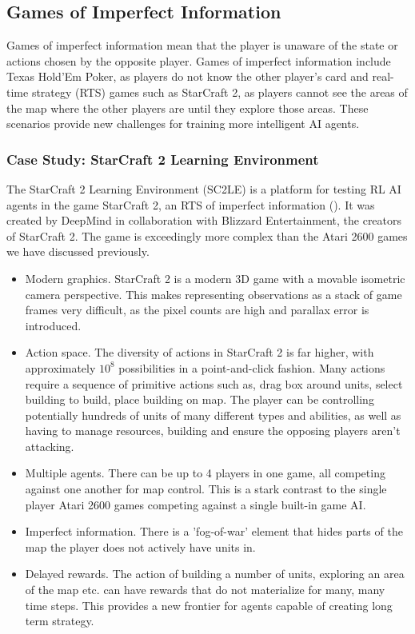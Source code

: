 \subsection{Games of Imperfect Information}
Games of imperfect information mean that the player is unaware of the state or actions chosen by the opposite player. Games of imperfect information include Texas Hold'Em Poker, as players do not know the other player's card and real-time strategy (RTS) games such as StarCraft 2, as players cannot see the areas of the map where the other players are until they explore those areas. These scenarios provide new challenges for training more intelligent AI agents.

\subsubsection{Case Study: StarCraft 2 Learning Environment}
The StarCraft 2 Learning Environment (SC2LE) is a platform for testing RL AI agents in the game StarCraft 2, an RTS of imperfect information (\citet{starcraft}). It was created by DeepMind in collaboration with Blizzard Entertainment, the creators of StarCraft 2. The game is exceedingly more complex than the Atari 2600 games we have discussed previously.
\begin{itemize}
    \item Modern graphics. StarCraft 2 is a modern 3D game with a movable isometric camera perspective. This makes representing observations as a stack of game frames very difficult, as the pixel counts are high and parallax error is introduced.
    \item  Action space. The diversity of actions in StarCraft 2 is far higher, with approximately $10^8$ possibilities in a point-and-click fashion. Many actions require a sequence of primitive actions such as, drag box around units, select building to build, place building on map. The player can be controlling potentially hundreds of units of many different types and abilities, as well as having to manage resources, building and ensure the opposing players aren't attacking.
    \item Multiple agents. There can be up to 4 players in one game, all competing against one another for map control. This is a stark contrast to the single player Atari 2600 games competing against a single built-in game AI.
    \item Imperfect information. There is a 'fog-of-war' element that hides parts of the map the player does not actively have units in.
    \item Delayed rewards. The action of building a number of units, exploring an area of the map etc. can have rewards that do not materialize for many, many time steps. This provides a new frontier for agents capable of creating long term strategy.
\end{itemize}

